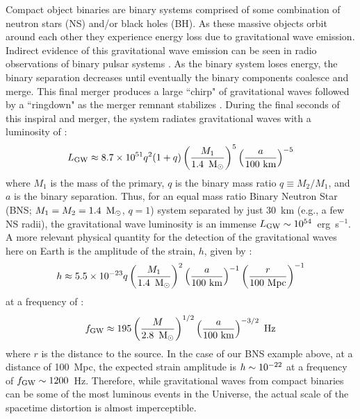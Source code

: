 Compact object binaries are binary systems comprised of some combination of neutron stars (NS) and/or black holes (BH). As these massive objects orbit around each other they experience energy loss due to gravitational wave emission. Indirect evidence of this gravitational wave emission can be seen in radio observations of binary pulsar systems \citep{HulseTaylor75,Weisberg+05}. As the binary system loses energy, the binary separation decreases until eventually the binary components coalesce and merge. This final merger produces a large ``chirp" of gravitational waves followed by a ``ringdown" as the merger remnant stabilizes \citep{Centrella+10}. During the final seconds of this inspiral and merger, the system radiates gravitational waves with a luminosity of \citep{FaberRasio12}:
\begin{equation}
\label{eq:intro_gwlum}
L_{\rm GW} \approx 8.7 \times 10^{51} q^2 (1+q) \left ( \frac{M_1}{1.4~\msun} \right )^5 \left ( \frac{a}{100~{\rm km}} \right )^{-5}
\end{equation}
\noindent where $M_1$ is the mass of the primary, $q$ is the binary mass ratio $q \equiv M_2 / M_1$, and $a$ is the binary separation. Thus, for an equal mass ratio Binary Neutron Star (BNS; $M_1 = M_2 = 1.4~{\rm\,M_\odot}$, $q = 1$) system separated by just 30~km (e.g., a few NS radii), the gravitational wave luminosity is an immense $L_{\rm GW} \sim 10^{54}$~erg~s$^{-1}$. A more relevant physical quantity for the detection of the gravitational waves here on Earth is the amplitude of the strain, $h$, given by \citep{FaberRasio12}:
\begin{equation}
\label{eq:intro_gwh}
h \approx 5.5 \times 10^{-23} q \left ( \frac{M_1}{1.4~\msun} \right )^2 \left ( \frac{a}{100~{\rm km}} \right )^{-1} \left ( \frac{r}{100~{\rm Mpc}} \right )^{-1}
\end{equation}
\noindent at a frequency of \citep{FaberRasio12}:
\begin{equation}
\label{eq:intro_gwf}
f_{\rm GW} \approx 195 \left ( \frac{M}{2.8~\msun} \right )^{1/2} \left ( \frac{a}{100~{\rm km}} \right )^{-3/2}~{\rm Hz}
\end{equation}
\noindent where $r$ is the distance to the source. In the case of our BNS example above, at a distance of 100~Mpc, the expected strain amplitude is $h \sim 10^{-22}$ at a frequency of $f_{\rm GW} \sim 1200$~Hz. Therefore, while gravitational waves from compact binaries can be some of the most luminous events in the Universe, the actual scale of the spacetime distortion is almost imperceptible.

